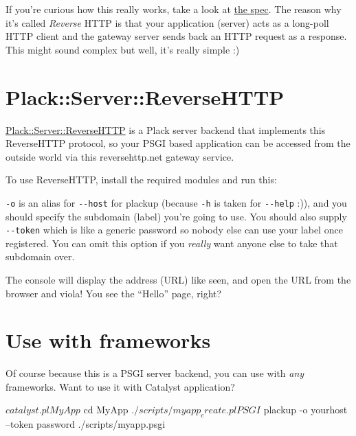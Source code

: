 If you're curious how this really works, take a look at
\href{http://www.reversehttp.net/specs.html}{the spec}. The reason why
it's called \emph{Reverse} HTTP is that your application (server) acts
as a long-poll HTTP client and the gateway server sends back an HTTP
request as a response. This might sound complex but well, it's really
simple :)

\section{Plack::Server::ReverseHTTP}\label{plackserverreversehttp}

\href{http://search.cpan.org/~miyagawa/Plack-Server-ReverseHTTP-0.01/}{Plack::Server::ReverseHTTP}
is a Plack server backend that implements this ReverseHTTP protocol, so
your PSGI based application can be accessed from the outside world via
this reversehttp.net gateway service.

To use ReverseHTTP, install the required modules and run this:


\lstinline!-o! is an alias for \lstinline!--host! for plackup (because
\lstinline!-h! is taken for \lstinline!--help! :)), and you should
specify the subdomain (label) you're going to use. You should also
supply \lstinline!--token! which is like a generic password so nobody
else can use your label once registered. You can omit this option if you
\emph{really} want anyone else to take that subdomain over.

The console will display the address (URL) like seen, and open the URL
from the browser and viola! You see the ``Hello'' page, right?

\section{Use with frameworks}\label{use-with-frameworks}

Of course because this is a PSGI server backend, you can use with
\emph{any} frameworks. Want to use it with Catalyst application?

\begin{shell}
$ catalyst.pl MyApp
$ cd MyApp
$ ./scripts/myapp_create.pl PSGI
$ plackup -o yourhost --token password ./scripts/myapp.psgi
\end{shell}

